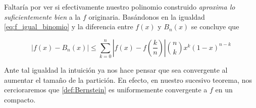 Faltaría por ver si efectivamente nuestro polinomio construido
 \textit{aproxima lo suficientemente bien} a la $f$ originaria. 
Basándonos en la igualdad \eqref{eq:f_igual_binomio} y 
la diferencia entre $f(x)$ y $B_n(x)$ se concluye que


\begin{equation} \label{eq:eq:Bernstein_diferencia}
    |f(x)-B_n(x)| \leq \sum_{k=0}^n \left|f(x) - f \left( \frac{k}{n} \right)\right|
    \binom{n}{k} x^{k} (1-x)^{n-k}
\end{equation} 

Ante tal igualdad la intuición ya nos
hace pensar que sea convergente al aumentar el tamaño de la partición.
 En efecto, en nuestro sucesivo teorema, nos cercioraremos que \ref{def:Bernstein}
 es uniformemente convergente a $f$ en un compacto. 

